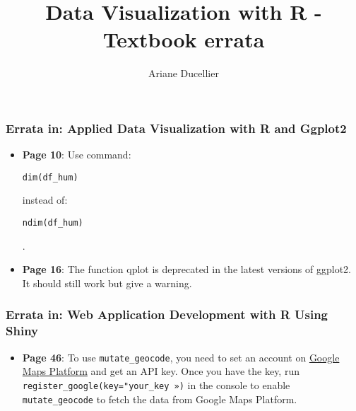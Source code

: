 \documentclass{beamer}
\title[Textbook errata]{Data Visualization with R - Textbook errata}
\author{Ariane Ducellier}
\begin{document}
	\begin{frame}
		\titlepage
	\end{frame}

	\begin{frame}[fragile]
		\frametitle{Errata in: Applied Data Visualization with R and Ggplot2}

		\begin{itemize}

		\item \textbf{Page 10}: Use command: \begin{verbatim}dim(df_hum)\end{verbatim} instead of: \begin{verbatim}ndim(df_hum)\end{verbatim}.

		\item \textbf{Page 16}: The function qplot is deprecated in the latest versions of ggplot2. It should still work but give a warning.

		\end{itemize}
	\end{frame}

	\begin{frame}[fragile]
		\frametitle{Errata in: Web Application Development with R Using Shiny}

		\begin{itemize}

		\item \textbf{Page 46}: To use \verb|mutate_geocode|, you need to set an account on \href{https://mapsplatform.google.com/}{Google Maps Platform} and get an API key. Once you have the key, run \verb|register_google(key="your_key »)| in the console to enable \verb|mutate_geocode| to fetch the data from Google Maps Platform.

		\end{itemize}
	\end{frame}
\end{document}
